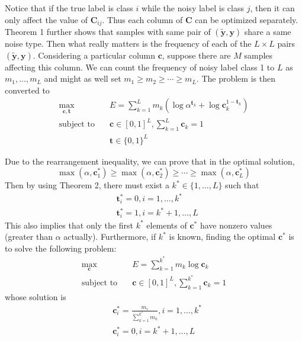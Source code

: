 \documentclass[10pt,twocolumn,letterpaper]{article}
\def\vec{\mathbf}
\def\mat{\mathbf}
\begin{document}
Notice that if the true label is class $i$ while the noisy label is class $j$, then it can only affect the value of $\mat{C}_{ij}$. Thus each column of $\mat{C}$ can be optimized separately. Theorem 1 further shows that samples with same pair of $(\tilde{\vec{y}},\vec{y})$ share a same noise type. Then what really matters is the frequency of each of the $L\times L$ pairs $(\tilde{\vec{y}},\vec{y})$. Considering a particular column $\vec{c}$, suppose there are $M$ samples affecting this column. We can count the frequency of noisy label class 1 to $L$ as $m_1,\dots,m_L$ and might as well set $m_1\geq m_2\geq \cdots \geq m_L$. The problem is then converted to
\begin{equation}
\begin{aligned}
\max_{\vec{c},\vec{t}} \quad & E=\sum_{k=1}^{L} m_k \left(\log \alpha^{\vec{t}_k} + \log \mat{c}_k^{1-\vec{t}_k}\right)\\
\text{subject to} \quad & \vec{c} \in [0,1]^L, \sum_{k=1}^{L} \vec{c}_k = 1 \\
                    & \vec{t} \in \{0,1\}^{L}
\end{aligned}
\end{equation}

Due to the rearrangement inequality, we can prove that in the optimal solution,
\begin{equation}
    \max(\alpha,\vec{c}^*_1) \geq \max(\alpha,\vec{c}^*_2) \geq \cdots \geq \max(\alpha,\vec{c}^*_L)
\end{equation}
Then by using Theorem 2, there must exist a $k^* \in \{1,\dots,L\}$ such that
\begin{equation} \label{eq:opt_t}
\begin{aligned}
    &\vec{t}^*_i = 0, i = 1,\dots,k^* \\
    &\vec{t}^*_i = 1, i = k^*+1,\dots,L
\end{aligned}
\end{equation}
This also implies that only the first $k^*$ elements of $\vec{c}^*$ have nonzero values (greater than $\alpha$ actually). Furthermore, if $k^*$ is known, finding the optimal $\vec{c}^*$ is to solve the following problem:
\begin{equation}
\begin{aligned}
\max_{\vec{c}} \quad & E=\sum_{k=1}^{k^*} m_k \log \mat{c}_k\\
\text{subject to} \quad & \vec{c} \in [0,1]^L, \sum_{k=1}^{k^*} \vec{c}_k = 1
\end{aligned}
\end{equation}
whose solution is
\begin{equation} \label{eq:opt_c}
\begin{aligned}
    &\vec{c}^*_i = \frac{m_i}{\sum_{k=1}^{k^*}{m_k}}, i = 1,\dots,k^* \\
    &\vec{c}^*_i = 0, i = k^*+1,\dots,L
\end{aligned}
\end{equation}
\end{document}
